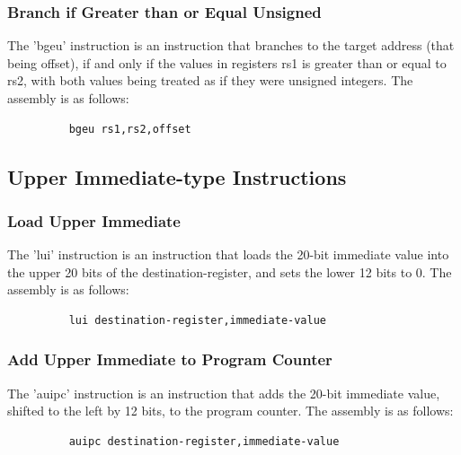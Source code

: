 \documentclass{article}
\begin{document}
\subsubsection{Branch if Greater than or Equal Unsigned}
\qquad
The 'bgeu' instruction is an instruction that branches to the target address (that being offset), if and only if the values in registers rs1 is greater than or equal to rs2, with both values being treated as if they were unsigned integers. The assembly is as follows:
\begin{figure}[!htbp]
    \centering
    \begin{verbatim}
    bgeu rs1,rs2,offset
    \end{verbatim}
\end{figure}\newline


\subsection{Upper Immediate-type Instructions}

\subsubsection{Load Upper Immediate}
\qquad
The 'lui' instruction is an instruction that loads the 20-bit immediate value into the upper 20 bits of the destination-register, and sets the lower 12 bits to 0. The assembly is as follows:
\begin{figure}[!htbp]
    \centering
    \begin{verbatim}
    lui destination-register,immediate-value
    \end{verbatim}
\end{figure}\newline

\subsubsection{Add Upper Immediate to Program Counter}
\qquad
The 'auipc' instruction is an instruction that adds the 20-bit immediate value, shifted to the left by 12 bits, to the program counter. The assembly is as follows:
\begin{figure}[!htbp]
    \centering
    \begin{verbatim}
    auipc destination-register,immediate-value
    \end{verbatim}
\end{figure}\newline
\end{document}
